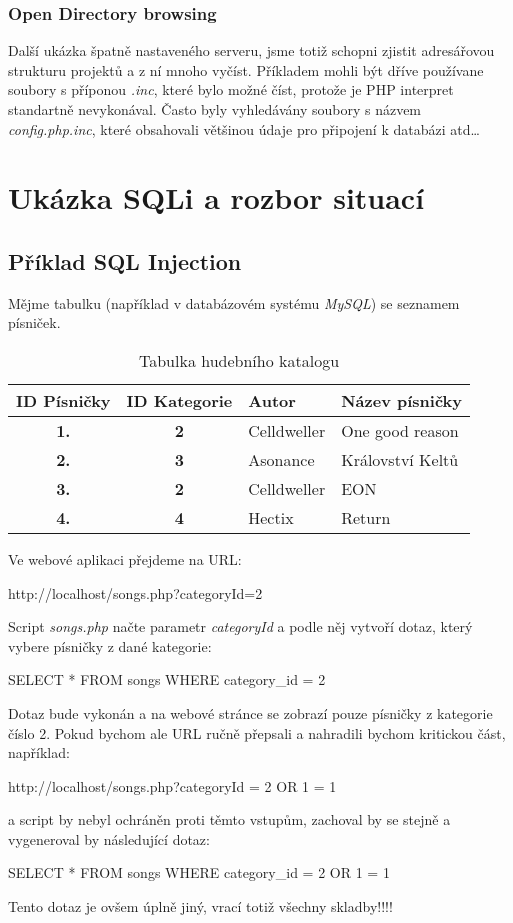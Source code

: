 \documentclass[12pt, a4paper]{report}
\begin{document}
\subsection{Open Directory browsing}
Další ukázka špatně nastaveného serveru, jsme totiž schopni zjistit adresářovou strukturu projektů a z ní mnoho vyčíst. Příkladem mohli být dříve používane soubory s příponou \textit{.inc}, které bylo možné číst, protože je PHP interpret standartně nevykonával. Často byly vyhledávány soubory s názvem \textit{config.php.inc}, které obsahovali většinou údaje pro připojení k databázi atd\ldots

\chapter{Ukázka SQLi a rozbor situací}

\section{Příklad SQL Injection}
Mějme tabulku (například v databázovém systému \textit{MySQL}) se seznamem písniček.
\begin{table}[!h]
\centering
\begin{tabular}{|c|c|l|l|}
\hline
\bf ID Písničky & \bf ID Kategorie & \bf Autor & \bf Název písničky \\
\hline
\hline
\bf 1. & \bf 2 & Celldweller & One good reason \\
\hline
\bf 2. & \bf 3 & Asonance & Království Keltů \\
\hline
\bf 3. & \bf 2 & Celldweller & EON \\
\hline
\bf 4. & \bf 4 & Hectix & Return \\
\hline
\end{tabular}
\label{tab:haz}
\caption{Tabulka hudebního katalogu}
\end{table}
\newline
Ve webové aplikaci přejdeme na URL:
\begin{center}
http://localhost/songs.php?categoryId=2
\end{center}
Script \textit{songs.php} načte parametr \textit{categoryId} a podle něj vytvoří dotaz, který vybere písničky z dané kategorie:
\begin{center}
SELECT * FROM songs WHERE category\_id = 2
\end{center}
Dotaz bude vykonán a na webové stránce se zobrazí pouze písničky z kategorie číslo 2. Pokud bychom ale URL ručně přepsali a nahradili bychom kritickou část, například:
\begin{center}
http://localhost/songs.php?categoryId = 2 OR 1 = 1
\end{center}
a script by nebyl ochráněn proti těmto  vstupům, zachoval by se stejně a vygeneroval by následující dotaz:
\begin{center}
SELECT * FROM songs WHERE category\_id = 2 OR 1 = 1
\end{center}
Tento dotaz je ovšem úplně jiný, vrací totiž všechny skladby!!!!
\end{document}
